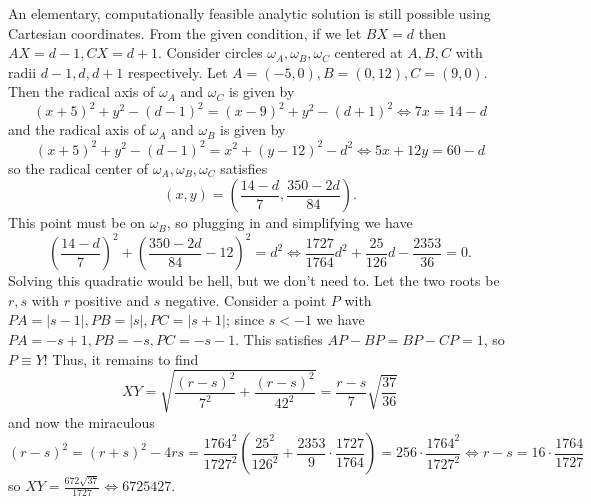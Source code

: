 \begin{solution}\hfil\medskip
	
	An elementary, computationally feasible analytic solution is still possible using Cartesian coordinates. From the given condition, if we let $BX = d$ then $AX = d - 1, CX = d + 1$. 
	Consider circles $\omega_A, \omega_B, \omega_C$ centered at $A, B, C$ with radii $d - 1, d, d + 1$ respectively. 
	Let $A = (-5, 0), B = (0, 12), C = (9, 0)$. Then the radical axis of $\omega_A$ and $\omega_C$ is given by
	$$(x + 5)^2 + y^2 - (d - 1)^2 = (x - 9)^2 + y^2 - (d + 1)^2 \iff 7x = 14 - d$$
	and the radical axis of $\omega_A$ and $\omega_B$ is given by
	$$(x + 5)^2 + y^2 - (d - 1)^2 = x^2 + (y - 12)^2 - d^2 \iff 5x + 12y = 60 - d$$
	so the radical center of $\omega_A, \omega_B, \omega_C$ satisfies $$(x, y) = \left(\dfrac{14 - d}{7}, \dfrac{350 - 2d}{84}\right).$$
	This point must be on $\omega_B$, so plugging in and simplifying we have
	$$\left(\dfrac{14 - d}{7}\right)^2 + \left(\dfrac{350 - 2d}{84} - 12\right)^2 = d^2 \iff \dfrac{1727}{1764}d^2 + \dfrac{25}{126}d - \dfrac{2353}{36} = 0.$$
	Solving this quadratic would be hell, but we don't need to. Let the two roots be $r, s$ with $r$ positive and $s$ negative. Consider a point $P$ with
	$PA = |s - 1|, PB = |s|, PC = |s + 1|$; since $s < -1$ we have $PA = -s + 1, PB = -s, PC = -s - 1$. This satisfies $AP - BP = BP - CP = 1$, so $P \equiv Y$! Thus, it remains to find
	$$XY = \sqrt{\dfrac{(r - s)^2}{7^2} + \dfrac{(r - s)^2}{42^2}} = \dfrac{r - s}{7} \sqrt{\dfrac{37}{36}}$$
	and now the miraculous 
	$$(r - s)^2 = (r + s)^2 - 4rs = \dfrac{1764^2}{1727^2} \left(\dfrac{25^2}{126^2} + \dfrac{2353}{9} \cdot \dfrac{1727}{1764}\right) = 256 \cdot \dfrac{1764^2}{1727^2} \iff r - s = 16 \cdot \dfrac{1764}{1727}$$
	so $XY = \frac{672 \sqrt{37}}{1727} \iff \boxed{6725427}.$
	
\end{solution}\bigskip
